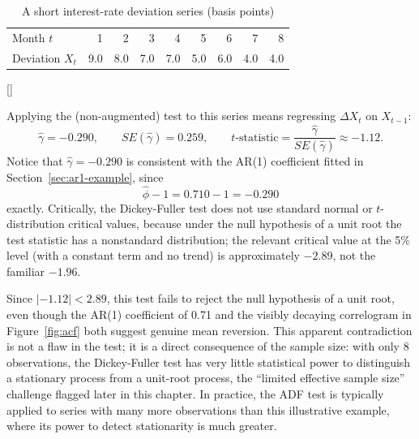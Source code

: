 \documentclass[../ai_in_finance]{subfiles}
\begin{document}
\begin{table}[htbp]
\centering
\begin{lrbox}{\bookmeasuredbox}
\begin{tabular}{lrrrrrrrr}
\toprule
Month $t$ & 1 & 2 & 3 & 4 & 5 & 6 & 7 & 8 \\
Deviation $X_t$ & 9.0 & 8.0 & 7.0 & 7.0 & 5.0 & 6.0 & 4.0 & 4.0 \\
\bottomrule
\end{tabular}
\end{lrbox}
\ifdim\wd\bookmeasuredbox<0.65\linewidth
\setlength{\bookcapwidth}{0.65\linewidth}
\else
\setlength{\bookcapwidth}{\wd\bookmeasuredbox}
\fi
{}[\bookcapwidth]{
\usebox{\bookmeasuredbox}
}{
\caption{A short interest-rate deviation series (basis points)}
\label{tab:ar1_data}
}
\end{table}

Applying the (non-augmented) test to this series means regressing $\Delta X_t$ on $X_{t-1}$:
\begin{equation*}
\hat\gamma = -0.290, \qquad SE(\hat\gamma) = 0.259, \qquad t\text{-statistic} = \frac{\hat\gamma}{SE(\hat\gamma)} \approx -1.12.
\end{equation*}
Notice that $\hat\gamma = -0.290$ is consistent with the AR(1) coefficient fitted in Section~\ref{sec:ar1-example}, since
$$\hat\phi - 1 = 0.710 - 1 = -0.290$$
exactly. Critically, the Dickey-Fuller test does not use standard normal or $t$-distribution critical values, because under the null hypothesis of a unit root the test statistic has a nonstandard distribution; the relevant critical value at the 5\% level (with a constant term and no trend) is approximately $-2.89$, not the familiar $-1.96$.

Since $|-1.12| < 2.89$, this test fails to reject the null hypothesis of a unit root, even though the AR(1) coefficient of 0.71 and the visibly decaying correlogram in Figure~\ref{fig:acf} both suggest genuine mean reversion. This apparent contradiction is not a flaw in the test; it is a direct consequence of the sample size: with only 8 observations, the Dickey-Fuller test has very little statistical power to distinguish a stationary process from a unit-root process, the ``limited effective sample size'' challenge flagged later in this chapter. In practice, the ADF test is typically applied to series with many more observations than this illustrative example, where its power to detect stationarity is much greater.
\end{document}
